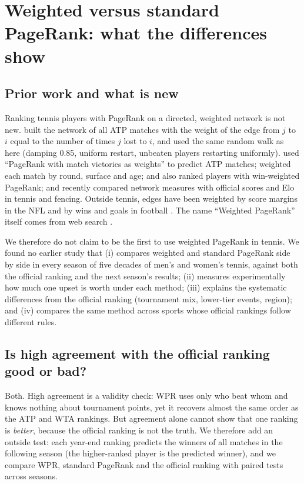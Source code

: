 \documentclass[11pt]{article}
\begin{document}
\clearpage
\section{Weighted versus standard PageRank: what the differences show}

\subsection{Prior work and what is new}
Ranking tennis players with PageRank on a directed, weighted network is not new. \citet{radicchi2011} built the network of all ATP matches with the weight of the edge from $j$ to $i$ equal to the number of times $j$ lost to $i$, and used the same random walk as here (damping 0.85, uniform restart, unbeaten players restarting uniformly). \citet{dingle2013} used ``PageRank with match victories as weights'' to predict ATP matches; \citet{aronson2017} weighted each match by round, surface and age; \citet{michieli2018} and \citet{needham2018} also ranked players with win-weighted PageRank; and \citet{asztalos2026} recently compared network measures with official scores and Elo in tennis and fencing. Outside tennis, edges have been weighted by score margins in the NFL \citep{govan2008} and by wins and goals in football \citep{lazova2015}. The name ``Weighted PageRank'' itself comes from web search \citep{xing2004}.

We therefore do not claim to be the first to use weighted PageRank in tennis. We found no earlier study that (i) compares weighted and standard PageRank side by side in every season of five decades of men's and women's tennis, against both the official ranking and the next season's results; (ii) measures experimentally how much one upset is worth under each method; (iii) explains the systematic differences from the official ranking (tournament mix, lower-tier events, region); and (iv) compares the same method across sports whose official rankings follow different rules.

\subsection{Is high agreement with the official ranking good or bad?}
Both. High agreement is a validity check: WPR uses only who beat whom and knows nothing about tournament points, yet it recovers almost the same order as the ATP and WTA rankings. But agreement alone cannot show that one ranking is \emph{better}, because the official ranking is not the truth. We therefore add an outside test: each year-end ranking predicts the winners of all matches in the following season (the higher-ranked player is the predicted winner), and we compare WPR, standard PageRank and the official ranking with paired tests across seasons.
\end{document}
